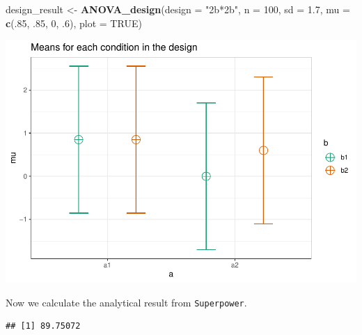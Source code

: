 \documentclass[]{book}
\newenvironment{Shaded}{\begin{snugshade}}{\end{snugshade}}
\newcommand{\DataTypeTok}[1]{\textcolor[rgb]{0.13,0.29,0.53}{#1}}
\newcommand{\DecValTok}[1]{\textcolor[rgb]{0.00,0.00,0.81}{#1}}
\newcommand{\FloatTok}[1]{\textcolor[rgb]{0.00,0.00,0.81}{#1}}
\newcommand{\KeywordTok}[1]{\textcolor[rgb]{0.13,0.29,0.53}{\textbf{#1}}}
\newcommand{\NormalTok}[1]{#1}
\newcommand{\OperatorTok}[1]{\textcolor[rgb]{0.81,0.36,0.00}{\textbf{#1}}}
\newcommand{\OtherTok}[1]{\textcolor[rgb]{0.56,0.35,0.01}{#1}}
\newcommand{\StringTok}[1]{\textcolor[rgb]{0.31,0.60,0.02}{#1}}
\begin{document}
\begin{Shaded}
\begin{Highlighting}[]
\NormalTok{design_result <-}\StringTok{ }\KeywordTok{ANOVA_design}\NormalTok{(}\DataTypeTok{design =} \StringTok{"2b*2b"}\NormalTok{,}
                              \DataTypeTok{n =} \DecValTok{100}\NormalTok{,}
                              \DataTypeTok{sd =} \FloatTok{1.7}\NormalTok{,}
                              \DataTypeTok{mu =} \KeywordTok{c}\NormalTok{(.}\DecValTok{85}\NormalTok{, }\FloatTok{.85}\NormalTok{, }
                                     \DecValTok{0}\NormalTok{, }\FloatTok{.6}\NormalTok{),}
                              \DataTypeTok{plot =} \OtherTok{TRUE}\NormalTok{)}
\end{Highlighting}
\end{Shaded}

\includegraphics{SuperpowerValidation_files/figure-latex/aberson_5.3.2-1.pdf}

Now we calculate the analytical result from \texttt{Superpower}.

\begin{Shaded}
\end{Shaded}

\begin{verbatim}
## [1] 89.75072
\end{verbatim}
\end{document}
